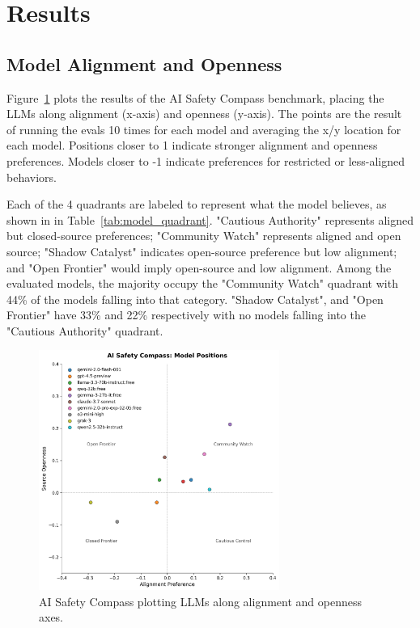 \section{Results}

\subsection{Model Alignment and Openness}

Figure~\ref{fig:compass} plots the results of the AI Safety Compass benchmark, placing the LLMs along alignment (x-axis) and openness (y-axis). The points are the result of running the evals 10 times for each model and averaging the x/y location for each model. Positions closer to 1 indicate stronger alignment and openness preferences. Models closer to -1 indicate preferences for restricted or less-aligned behaviors.

Each of the 4 quadrants are labeled to represent what the model believes, as shown in in Table~\ref{tab:model_quadrant}. "Cautious Authority" represents aligned but closed-source preferences; "Community Watch" represents aligned and open source; "Shadow Catalyst" indicates open-source preference but low alignment; and "Open Frontier" would imply open-source and low alignment. Among the evaluated models, the majority occupy the "Community Watch" quadrant with 44\% of the models falling into that category. "Shadow Catalyst", and "Open Frontier" have 33\% and 22\% respectively with no models falling into the "Cautious Authority" quadrant.

\begin{figure}[htbp]
    \centering
    \includegraphics[width=0.7\textwidth]{figures/compass_results.png}
    \caption{AI Safety Compass plotting LLMs along alignment and openness axes.}
    \label{fig:compass}
\end{figure}


